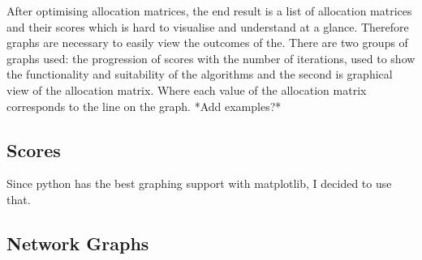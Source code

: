 After optimising allocation matrices, the end result is a list of allocation matrices and their scores which is hard to visualise and understand at a glance. Therefore graphs are necessary to easily view the outcomes of the. There are two groups of graphs used: the progression of scores with the number of iterations, used to show the functionality and suitability of the algorithms and the second is graphical view of the allocation matrix. Where each value of the allocation matrix corresponds to the line on the graph.
*Add examples?*

\subsection{Scores}

Since python has the best graphing support with matplotlib, I decided to use that.  

\subsection{Network Graphs}